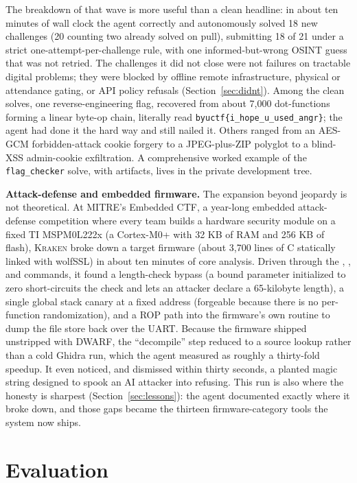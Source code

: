 \documentclass[10pt,twocolumn]{article}
\newcommand{\kraken}{\textsc{Kraken}}
\newcommand{\code}[1]{\seqsplit{\texttt{#1}}}
\begin{document}
The breakdown of that wave is more useful than a clean headline: in about ten
minutes of wall clock the agent correctly and autonomously solved 18 new challenges (20 counting two already
solved on pull), submitting 18 of 21 under a strict one-attempt-per-challenge rule, with one
informed-but-wrong OSINT guess that was not retried. The challenges it did not close were not failures on
tractable digital problems; they were blocked by offline remote infrastructure, physical or attendance
gating, or API policy refusals (Section~\ref{sec:didnt}). Among the clean solves, one reverse-engineering
flag, recovered from about 7{,}000 dot-functions forming a linear byte-op chain, literally read
\texttt{byuctf\{i\_hope\_u\_used\_angr\}}; the agent had done it the hard way and still nailed it. Others
ranged from an AES-GCM forbidden-attack cookie forgery to a JPEG-plus-ZIP polyglot to a blind-XSS admin-cookie
exfiltration. A comprehensive worked example of the \texttt{flag\_checker} solve, with artifacts, lives in
the private development tree.

\medskip
\textbf{Attack-defense and embedded firmware.} The expansion beyond jeopardy is not theoretical. At MITRE's
Embedded CTF, a year-long embedded attack-defense competition where every team builds a hardware security
module on a fixed TI MSPM0L222x (a Cortex-M0+ with 32 KB of RAM and 256 KB of flash), \kraken{} broke down a
target firmware (about 3{,}700 lines of C statically linked with wolfSSL) in about ten minutes of core
analysis. Driven through the \code{/triage}, \code{/decompile}, and \code{/postmortem} commands, it found a
\code{read\_packet} length-check bypass (a bound parameter initialized to zero short-circuits the check and
lets an attacker declare a 65-kilobyte length), a single global stack canary at a fixed address (forgeable
because there is no per-function randomization), and a ROP path into the firmware's own \code{write\_bytes}
routine to dump the file store back over the UART. Because the firmware shipped unstripped with DWARF, the
``decompile'' step reduced to a source lookup rather than a cold Ghidra run, which the agent measured as
roughly a thirty-fold speedup. It even noticed, and dismissed within thirty seconds, a planted magic string
designed to spook an AI attacker into refusing. This run is also where the honesty is sharpest
(Section~\ref{sec:lessons}): the agent documented exactly where it broke down, and those gaps became the
thirteen firmware-category tools the system now ships.

\section{Evaluation}
\label{sec:eval}
\end{document}
